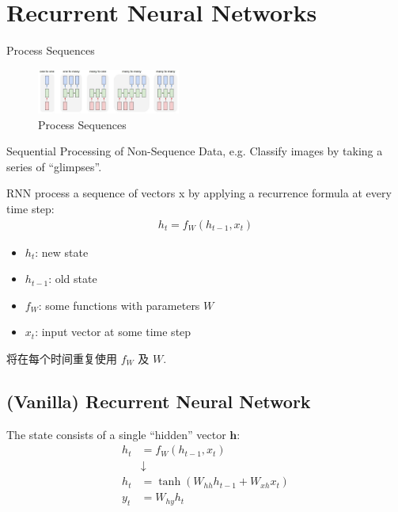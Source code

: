 \newpage
\section{Recurrent Neural Networks}
Process Sequences

\begin{figure}[!htb]
    \centering
    \includegraphics[width=0.42\textwidth]{pic/Lec10/Process Sequences.png}
    \caption{Process Sequences}
\end{figure}

Sequential Processing of Non-Sequence Data, e.g. Classify images by taking a series of ``glimpses''. 

RNN process a sequence of vectors x by applying a recurrence formula at every time step:
\begin{align*}
    h_t=f_W(h_{t-1}, x_t)
\end{align*}

\begin{itemize}
    \item $h_t$: new state
    \item $h_{t-1}$: old state
    \item $f_W$: some functions with parameters $W$
    \item $x_t$: input vector at some time step 
\end{itemize}


将在每个时间重复使用 $f_W$ 及 $W$. 

\subsection{(Vanilla) Recurrent Neural Network}
The state consists of a single ``hidden'' vector $\mathbf{h}$: 
\begin{align*}
    h_t&=f_W(h_{t-1}, x_t)\\
    & \downarrow\\
    h_t&=\tanh (W_{hh}h_{t-1}+W_{xh}x_t)\\
    y_t&=W_{hy}h_t
\end{align*}

